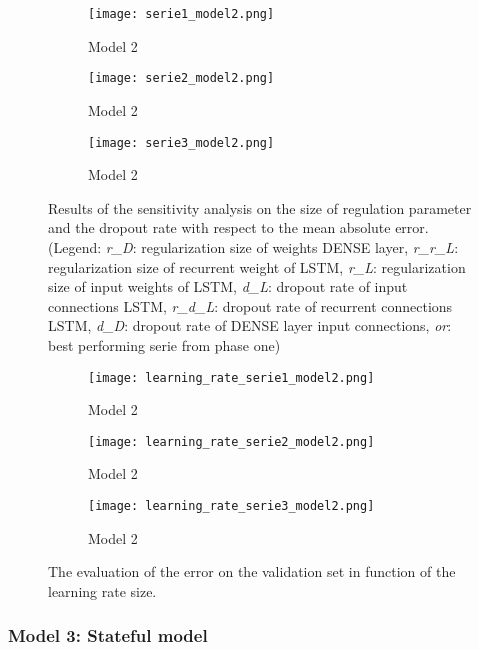 \begin{figure}[ht]
	\centering
	\begin{subfigure}{0.49\linewidth}
		\texttt{[image: serie1\_model2.png]}
		\caption{Model 2}
	\end{subfigure}	
	\begin{subfigure}{0.49\linewidth}
		\texttt{[image: serie2\_model2.png]}
		\caption{Model 2}
	\end{subfigure}
	\begin{subfigure}{0.5\linewidth}
		\texttt{[image: serie3\_model2.png]}
		\caption{Model 2}
	\end{subfigure}
	\caption{Results of the sensitivity analysis on the size of regulation parameter and the dropout rate with respect to the mean absolute error.(Legend: \textit{r\_D}: regularization size of weights DENSE layer,  \textit{r\_r\_L}: regularization size of recurrent weight of LSTM, \textit{r\_L}: regularization size of input weights of LSTM, \textit{d\_L}: dropout rate of input connections LSTM, \textit{r\_d\_L}: dropout rate of recurrent connections LSTM, \textit{d\_D}: dropout rate of DENSE layer input connections, \textit{or}: best performing serie from phase one)}
	\label{fig:sensitivity_model2}
\end{figure}


\begin{figure}[h]
	\centering
	\begin{subfigure}{0.49\linewidth}
		\texttt{[image: learning\_rate\_serie1\_model2.png]}
		\caption{Model 2}
	\end{subfigure}	
	\begin{subfigure}{0.49\linewidth}
		\texttt{[image: learning\_rate\_serie2\_model2.png]}
		\caption{Model 2}
	\end{subfigure}
	\begin{subfigure}{0.5\linewidth}
		\texttt{[image: learning\_rate\_serie3\_model2.png]}
		\caption{Model 2}
	\end{subfigure}
	\caption{The evaluation of the error on the validation set in function of the learning rate size.}
	\label{fig:learning_rate_model1}
\end{figure}


\subsubsection{Model 3: Stateful model}

